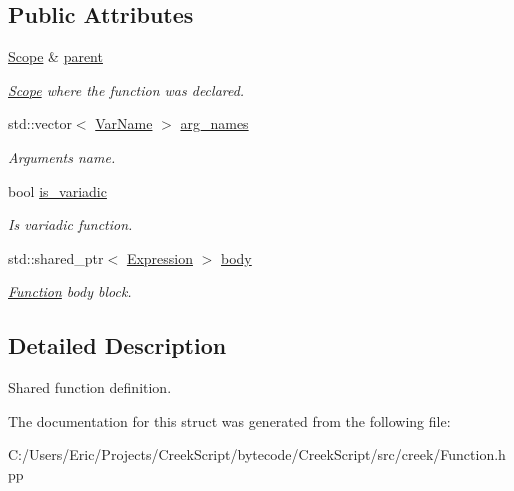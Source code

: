 \subsection*{Public Attributes}
\begin{DoxyCompactItemize}
\item 
\hyperlink{classcreek_1_1_scope}{Scope} \& \hyperlink{structcreek_1_1_function_1_1_definition_a7758a340c48471dbc8466ff587cb66ab}{parent}\hypertarget{structcreek_1_1_function_1_1_definition_a7758a340c48471dbc8466ff587cb66ab}{}\label{structcreek_1_1_function_1_1_definition_a7758a340c48471dbc8466ff587cb66ab}

\begin{DoxyCompactList}\small\item\em \hyperlink{classcreek_1_1_scope}{Scope} where the function was declared. \end{DoxyCompactList}\item 
std\+::vector$<$ \hyperlink{classcreek_1_1_var_name}{Var\+Name} $>$ \hyperlink{structcreek_1_1_function_1_1_definition_ada7202b71b79c370d50da09fd6ed847e}{arg\+\_\+names}\hypertarget{structcreek_1_1_function_1_1_definition_ada7202b71b79c370d50da09fd6ed847e}{}\label{structcreek_1_1_function_1_1_definition_ada7202b71b79c370d50da09fd6ed847e}

\begin{DoxyCompactList}\small\item\em Arguments name. \end{DoxyCompactList}\item 
bool \hyperlink{structcreek_1_1_function_1_1_definition_aa1caeec6ab3ec9691487f79c2e4a2873}{is\+\_\+variadic}\hypertarget{structcreek_1_1_function_1_1_definition_aa1caeec6ab3ec9691487f79c2e4a2873}{}\label{structcreek_1_1_function_1_1_definition_aa1caeec6ab3ec9691487f79c2e4a2873}

\begin{DoxyCompactList}\small\item\em Is variadic function. \end{DoxyCompactList}\item 
std\+::shared\+\_\+ptr$<$ \hyperlink{classcreek_1_1_expression}{Expression} $>$ \hyperlink{structcreek_1_1_function_1_1_definition_a13aad3e809a8c20295da20940f8e227f}{body}\hypertarget{structcreek_1_1_function_1_1_definition_a13aad3e809a8c20295da20940f8e227f}{}\label{structcreek_1_1_function_1_1_definition_a13aad3e809a8c20295da20940f8e227f}

\begin{DoxyCompactList}\small\item\em \hyperlink{classcreek_1_1_function}{Function} body block. \end{DoxyCompactList}\end{DoxyCompactItemize}


\subsection{Detailed Description}
Shared function definition. 

The documentation for this struct was generated from the following file\+:\begin{DoxyCompactItemize}
\item 
C\+:/\+Users/\+Eric/\+Projects/\+Creek\+Script/bytecode/\+Creek\+Script/src/creek/Function.\+hpp\end{DoxyCompactItemize}
